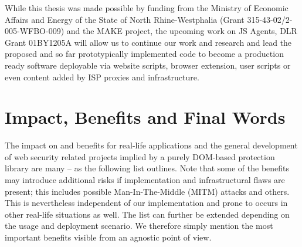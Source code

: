 While this thesis was made possible by funding from the Ministry of Economic Affairs and Energy of the State of North Rhine-Westphalia (Grant 315-43-02/2-005-WFBO-009) and the MAKE project, the upcoming work on JS Agents, DLR Grant 01BY1205A will allow us to continue our work and research and lead the proposed and so far prototypically implemented code to become a production ready software deployable via website scripts, browser extension, user scripts or even content added by ISP proxies and infrastructure. \\

\section{Impact, Benefits and Final Words}

The impact on and benefits for real-life applications and the general development of web security related projects implied by a purely DOM-based protection library are many -- as the following list outlines. Note that some of the benefits may introduce additional risks if implementation and infrastructural flaws are present; this includes possible Man-In-The-Middle (MITM) attacks and others. This is nevertheless independent of our implementation and prone to occurs in other real-life situations as well. The list can further be extended depending on the usage and deployment scenario. We therefore simply mention the most important benefits visible from an agnostic point of view.

